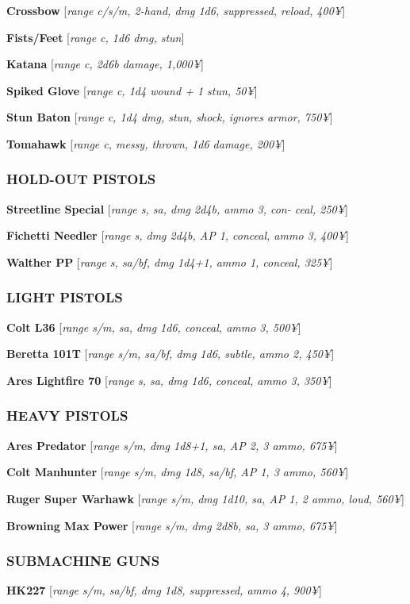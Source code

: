 \documentclass[oneside,10pt]{article}
\begin{document}
\begin{multicols}{2}
  \textbf{Crossbow} [\textit{range c/s/m, 2-hand, dmg 1d6, suppressed,
    reload, 400¥}]

  \textbf{Fists/Feet} [\textit{range c, 1d6 dmg, stun}]

  \textbf{Katana} [\textit{range c, 2d6b damage, 1,000¥}]

  \textbf{Spiked Glove} [\textit{range c, 1d4 wound + 1 stun, 50¥}]

  \textbf{Stun Baton} [\textit{range c, 1d4 dmg, stun, shock, ignores
    armor, 750¥}]

  \textbf{Tomahawk} [\textit{range c, messy, thrown, 1d6 damage,
    200¥}]


  \subsubsection{HOLD-OUT PISTOLS}
  \textbf{Streetline Special} [\textit{range s, sa, dmg 2d4b, ammo 3,
    con- ceal, 250¥}]

  \textbf{ Fichetti Needler} [\textit{range s, dmg 2d4b, AP 1,
    conceal, ammo 3, 400¥}]

  \textbf{Walther PP} [\textit{range s, sa/bf, dmg 1d4+1, ammo 1,
    conceal, 325¥}]


  \subsubsection{LIGHT PISTOLS}
  \textbf{Colt L36} [\textit{range s/m, sa, dmg 1d6, conceal, ammo 3,
    500¥}]

  \textbf{Beretta 101T} [\textit{range s/m, sa/bf, dmg 1d6, subtle,
    ammo 2, 450¥}]

  \textbf{Ares Lightfire 70} [\textit{range s, sa, dmg 1d6, conceal,
    ammo 3, 350¥}]


  \subsubsection{HEAVY PISTOLS}
  \textbf{Ares Predator} [\textit{range s/m, dmg 1d8+1, sa, AP 2, 3
    ammo, 675¥}]

  \textbf{Colt Manhunter} [\textit{range s/m, dmg 1d8, sa/bf, AP 1, 3
    ammo, 560¥}]

  \textbf{Ruger Super Warhawk} [\textit{range s/m, dmg 1d10, sa, AP 1,
    2 ammo, loud, 560¥}]

  \textbf{Browning Max Power} [\textit{range s/m, dmg 2d8b, sa, 3
    ammo, 675¥}]


  \subsubsection{SUBMACHINE GUNS}
  \textbf{HK227} [\textit{range s/m, sa/bf, dmg 1d8, suppressed, ammo
    4, 900¥}]


\end{multicols}
\end{document}
